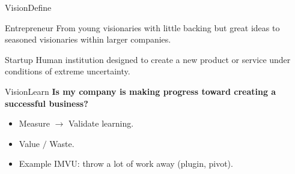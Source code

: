 \documentclass[aspectratio=169]{beamer}
\begin{document}
\begin{frame}{Vision}{Define}
  \begin{block}{Entrepreneur}
    From young visionaries with little backing but great ideas to seasoned
    visionaries within larger companies.
  \end{block}
  \begin{block}{Startup}
    Human institution designed to create a new product or service under
    conditions of extreme uncertainty.
  \end{block}
\end{frame}


\begin{frame}{Vision}{Learn}
\Large \textbf{Is my company is making progress toward creating a successful business?} \normalsize \\
\pause

  \begin{itemize}
    \item Measure $\rightarrow$ Validate learning.
    \item Value $/$ Waste.
    \item Example IMVU: throw a lot of work away (plugin, pivot).
  \end{itemize}
\end{frame}
\end{document}
